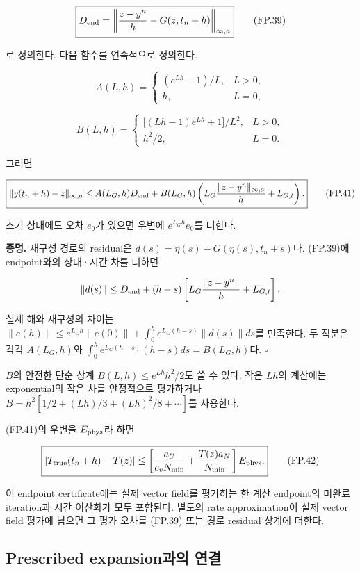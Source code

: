 \documentclass[11pt,a4paper]{article}
\begin{document}
\[
\boxed{
D_{\rm end}
=
\left\|
\frac{z-y^n}{h}-G(z,t_n+h)
\right\|_{\infty,a}
}
\tag{FP.39}
\]

로 정의한다. 다음 함수를 연속적으로 정의한다.

\[
A(L,h)=
\begin{cases}
(e^{Lh}-1)/L,&L>0,\\
h,&L=0,
\end{cases}
\]

\[
B(L,h)=
\begin{cases}
\bigl[(Lh-1)e^{Lh}+1\bigr]/L^2,&L>0,\\
h^2/2,&L=0 .
\end{cases}
\tag{FP.40}
\]

그러면

\[
\boxed{
\|y(t_n+h)-z\|_{\infty,a}
\le
A(L_G,h)D_{\rm end}
+
B(L_G,h)
\left(
L_G\frac{\|z-y^n\|_{\infty,a}}h+L_{G,t}
\right).
}
\tag{FP.41}
\]

초기 상태에도 오차 \(e_0\)가 있으면 우변에 \(e^{L_Gh}e_0\)를 더한다.

\textbf{증명.} 재구성 경로의 residual은 \(d(s)=\dot\eta(s)-G(\eta(s),t_n+s)\)다. (FP.39)에 endpoint와의 상태·시간 차를 더하면

\[
\|d(s)\|
\le D_{\rm end}
+(h-s)
\left[
L_G\frac{\|z-y^n\|}h+L_{G,t}
\right].
\]

실제 해와 재구성의 차이는 \(\|e(h)\|\le e^{L_Gh}\|e(0)\|+\int_0^h e^{L_G(h-s)}\|d(s)\|ds\)를 만족한다. 두 적분은 각각 \(A(L_G,h)\)와 \(\int_0^h e^{L_G(h-s)}(h-s)ds=B(L_G,h)\)다. \(\square\)

\(B\)의 안전한 단순 상계 \(B(L,h)\le e^{Lh}h^2/2\)도 쓸 수 있다. 작은 \(Lh\)의 계산에는 exponential의 작은 차를 안정적으로 평가하거나 \(B=h^2[1/2+(Lh)/3+(Lh)^2/8+\cdots]\)를 사용한다.

(FP.41)의 우변을 \(E_{\rm phys}\)라 하면

\[
\boxed{
|T_{\rm true}(t_n+h)-T(z)|
\le
\left[
\frac{a_U}{c_vN_{\min}}
+\frac{T(z)a_N}{N_{\min}}
\right]E_{\rm phys}.
}
\tag{FP.42}
\]

이 endpoint certificate에는 실제 vector field를 평가하는 한 계산 endpoint의 미완료 iteration과 시간 이산화가 모두 포함된다. 별도의 rate approximation이 실제 vector field 평가에 남으면 그 평가 오차를 (FP.39) 또는 경로 residual 상계에 더한다.

\hypertarget{prescribed-expansionuxacfcuxc758-uxc5f0uxacb0}{%
\subsection{Prescribed expansion과의 연결}\label{prescribed-expansionuxacfcuxc758-uxc5f0uxacb0}}
\end{document}
